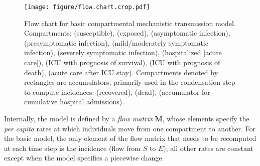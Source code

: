 \documentclass[12pt]{article}\usepackage[]{graphicx}\usepackage[]{color}
\begin{document}
\begin{figure}
\color{fgcolor}
\texttt{[image: figure/flow.chart.crop.pdf]}
\caption{Flow chart for basic compartmental mechanistic transmission model. 
Compartments:  (susceptible),  (exposed),  (asymptomatic infection),  (presymptomatic infection),  (mild/moderately symptomatic infection),  (severely symptomatic infection),  (hospitalized [acute care]),  (ICU with prognosis of survival),  (ICU with prognosis of death),  (acute care after ICU stay). 
Compartments denoted by rectangles are accumulators, primarily used in the condensation step to compute incidences:  (recovered),  (dead),  (accumulator for cumulative hospital admissions).
}
\label{fig:flowchart}
\end{figure}



Internally, the model is defined by a \emph{flow matrix} $\mathbf{M}$, whose elements specify the \emph{per capita} rates at which individuals move from one compartment to another.
For the basic model, the only element of the flow matrix that needs to be recomputed at each time step is the incidence (flow from $S$ to $E$); all other rates are constant except when the model specifies a piecewise change.
\end{document}
